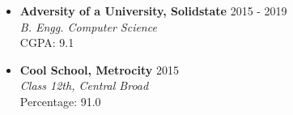 \begin{itemize}

\item
{\bf Adversity of a University, Solidstate}
\hfill 2015 - 2019
\\ {\it B. Engg. Computer Science}
\\ CGPA: 9.1

\item
{\bf Cool School, Metrocity}
\hfill 2015
\\ {\it Class 12th, Central Broad}
\\ Percentage: 91.0

\end{itemize}
